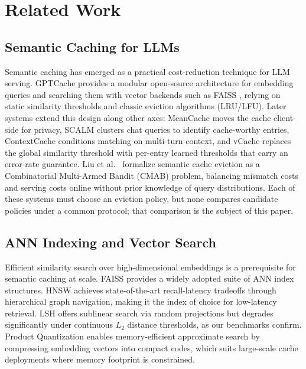 \documentclass[sigconf,nonacm]{acmart}
\begin{document}
\section{Related Work}
\subsection{Semantic Caching for LLMs}
Semantic caching has emerged as a practical cost-reduction technique for LLM serving. GPTCache \cite{bang2023gptcache} provides a modular open-source architecture for embedding queries and searching them with vector backends such as FAISS \cite{johnson2019faiss}, relying on static similarity thresholds and classic eviction algorithms (LRU/LFU). Later systems extend this design along other axes: MeanCache \cite{gill2025meancache} moves the cache client-side for privacy, SCALM \cite{li2024scalm} clusters chat queries to identify cache-worthy entries, ContextCache \cite{yan2025contextcache} conditions matching on multi-turn context, and vCache \cite{schroeder2025vcache} replaces the global similarity threshold with per-entry learned thresholds that carry an error-rate guarantee. Liu et al.\ \cite{liu2026semantic} formalize semantic cache eviction as a Combinatorial Multi-Armed Bandit (CMAB) problem, balancing mismatch costs and serving costs online without prior knowledge of query distributions. Each of these systems must choose an eviction policy, but none compares candidate policies under a common protocol; that comparison is the subject of this paper.

\subsection{ANN Indexing and Vector Search}
Efficient similarity search over high-dimensional embeddings is a prerequisite for semantic caching at scale. FAISS \cite{johnson2019faiss} provides a widely adopted suite of ANN index structures. HNSW \cite{malkov2018hnsw} achieves state-of-the-art recall-latency tradeoffs through hierarchical graph navigation, making it the index of choice for low-latency retrieval. LSH \cite{indyk1998ann} offers sublinear search via random projections but degrades significantly under continuous $L_2$ distance thresholds, as our benchmarks confirm. Product Quantization \cite{jegou2011pq} enables memory-efficient approximate search by compressing embedding vectors into compact codes, which suits large-scale cache deployments where memory footprint is constrained.
\end{document}
